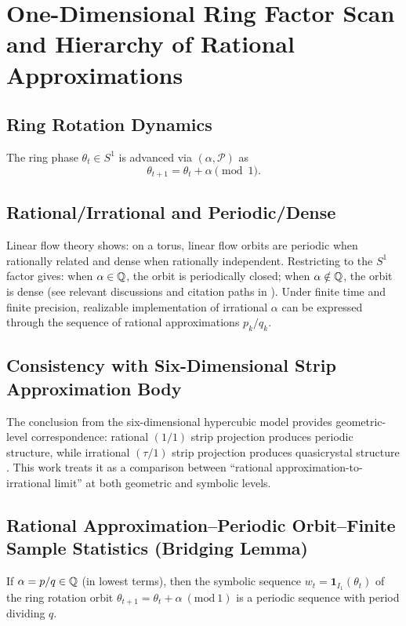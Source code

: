 \section{One-Dimensional Ring Factor Scan and Hierarchy of Rational Approximations}

\subsection{Ring Rotation Dynamics}

The ring phase $\theta_t\in S^1$ is advanced via $(\alpha,\mathcal{P})$ as
\[
\theta_{t+1}=\theta_t+\alpha\pmod 1.
\]

\subsection{Rational/Irrational and Periodic/Dense}

Linear flow theory shows: on a torus, linear flow orbits are periodic when rationally related and dense when rationally independent. Restricting to the $S^1$ factor gives: when $\alpha\in\mathbb{Q}$, the orbit is periodically closed; when $\alpha\notin\mathbb{Q}$, the orbit is dense (see relevant discussions and citation paths in \cite{WikipediaSturmianWord}).
Under finite time and finite precision, realizable implementation of irrational $\alpha$ can be expressed through the sequence of rational approximations $p_k/q_k$.

\subsection{Consistency with Six-Dimensional Strip Approximation Body}

The conclusion from the six-dimensional hypercubic model provides geometric-level correspondence: rational $(1/1)$ strip projection produces periodic structure, while irrational $(\tau/1)$ strip projection produces quasicrystal structure \cite{PRB46_6091}.
This work treats it as a comparison between ``rational approximation-to-irrational limit'' at both geometric and symbolic levels.

\subsection{Rational Approximation--Periodic Orbit--Finite Sample Statistics (Bridging Lemma)}

\begin{lemma}\label{lem:rational-periodic}
If $\alpha=p/q\in\mathbb{Q}$ (in lowest terms), then the symbolic sequence $w_t=\mathbf{1}_{I_1}(\theta_t)$ of the ring rotation orbit $\theta_{t+1}=\theta_t+\alpha\ (\mathrm{mod}\ 1)$ is a periodic sequence with period dividing $q$.
\end{lemma}

